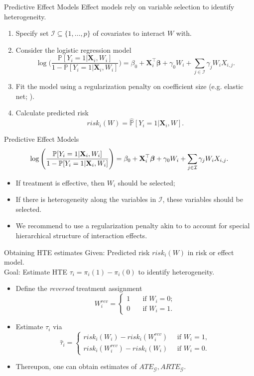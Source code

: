 \documentclass[11pt]{beamer}
\newcommand{\X}{\mathbf{X}}
\renewcommand{\P}{\mathbb{P}}
\newcommand{\G}{\mathcal{G}}
\begin{document}
\begin{frame}{Predictive Effect Models}
Effect models \citep{kent2020path} rely on variable selection to identify heterogeneity.
\begin{enumerate}
	\item Specify set $\mathcal{I} \subseteq \{1,\dots,p\}$ of covariates to interact $W$ with.
	\item Consider the logistic regression model
	\[
	\log \Bigg( \frac{\P[Y_i = 1 | \X_i, W_i]}{1 - \P[Y_i = 1 | \X_i, W_i]} \Bigg)
	=
	\beta_0 + \X_i^\top \bm{\beta} + \gamma_0 W_i + \sum_{j\in\mathcal{I}} \gamma_j W_i X_{i,j}.
	\]
	\item Fit the model using a regularization penalty on coefficient size (e.g. elastic net; \citealp{zou2005}).
	\item Calculate predicted risk \[risk_i(W) = \widehat{\P}[Y_i = 1 | \X_i, W].\]
\end{enumerate}
\end{frame}

\begin{frame}{Predictive Effect Models}
\[
	\log \Bigg( \frac{\P[Y_i = 1 | \X_i, W_i]}{1 - \P[Y_i = 1 | \X_i, W_i]} \Bigg)
	=
	\beta_0 + \X_i^\top \bm{\beta} + \gamma_0 W_i + \sum_{j\in\mathcal{I}} \gamma_j W_i X_{i,j}. \bigskip
\]

\begin{itemize}\setlength\itemsep{1em}
	\item If treatment is effective, then $W_i$ should be selected;
	\item If there is heterogeneity along the variables in $\mathcal{I}$, these variables should be selected. 
	\item We recommend to use a regularization penalty akin to \cite{bien2013} to account for special hierarchical structure of interaction effects.
\end{itemize}
\end{frame}


\begin{frame}{Obtaining HTE estimates}
\alert{Given:} Predicted risk $risk_i(W)$ in risk or effect model.\\\medskip
\alert{Goal:} Estimate HTE $\tau_i = \pi_i(1) - \pi_i(0)$ to identify heterogeneity.\bigskip

\begin{itemize}
\item Define the \textit{reversed} treatment assignment
\[
	W_i^{rev} = 
	\begin{cases}
	1 \quad &\text{if } W_i = 0;\\
	0 \quad &\text{if } W_i = 1.
	\end{cases}
\] 
\item Estimate $\tau_i$ via
\[
	\widehat{\tau}_i
	= 
	\begin{cases}	
	 risk_i(W_i) - risk_i(W_i^{rev}) \quad \text{ if } W_i = 1,\\
	 risk_i(W_i^{rev}) - risk_i(W_i) \quad \text{ if } W_i = 0.
	 \end{cases}
\]
\item Thereupon, one can obtain estimates of $ATE_{\G}, ARTE_{\G}$.
\end{itemize}
\end{frame}
\end{document}
